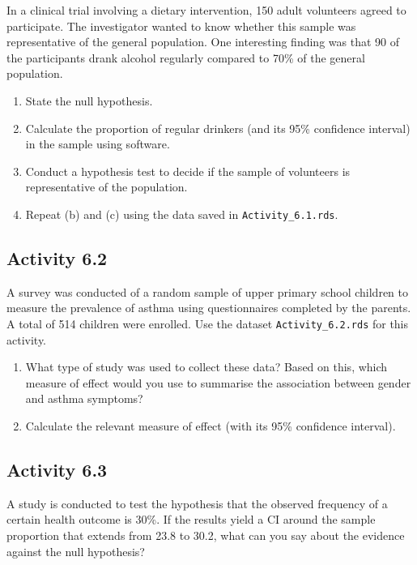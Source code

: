 \documentclass[
  a4paper,
]{memoir}
\providecommand{\tightlist}{%
  \setlength{\itemsep}{0pt}\setlength{\parskip}{0pt}}
\begin{document}
In a clinical trial involving a dietary intervention, 150 adult
volunteers agreed to participate. The investigator wanted to know
whether this sample was representative of the general population. One
interesting finding was that 90 of the participants drank alcohol
regularly compared to 70\% of the general population.

\begin{enumerate}
\def\labelenumi{\alph{enumi})}
\tightlist
\item
  State the null hypothesis.
\item
  Calculate the proportion of regular drinkers (and its 95\% confidence
  interval) in the sample using software.
\item
  Conduct a hypothesis test to decide if the sample of volunteers is
  representative of the population.
\item
  Repeat (b) and (c) using the data saved in \texttt{Activity\_6.1.rds}.
\end{enumerate}

\subsection*{Activity 6.2}\label{activity-6.2}

A survey was conducted of a random sample of upper primary school
children to measure the prevalence of asthma using questionnaires
completed by the parents. A total of 514 children were enrolled. Use the
dataset \texttt{Activity\_6.2.rds} for this activity.

\begin{enumerate}
\def\labelenumi{\alph{enumi})}
\tightlist
\item
  What type of study was used to collect these data? Based on this,
  which measure of effect would you use to summarise the association
  between gender and asthma symptoms?
\item
  Calculate the relevant measure of effect (with its 95\% confidence
  interval).
\end{enumerate}

\subsection*{Activity 6.3}\label{activity-6.3}

A study is conducted to test the hypothesis that the observed frequency
of a certain health outcome is 30\%. If the results yield a CI around
the sample proportion that extends from 23.8 to 30.2, what can you say
about the evidence against the null hypothesis?
\end{document}
